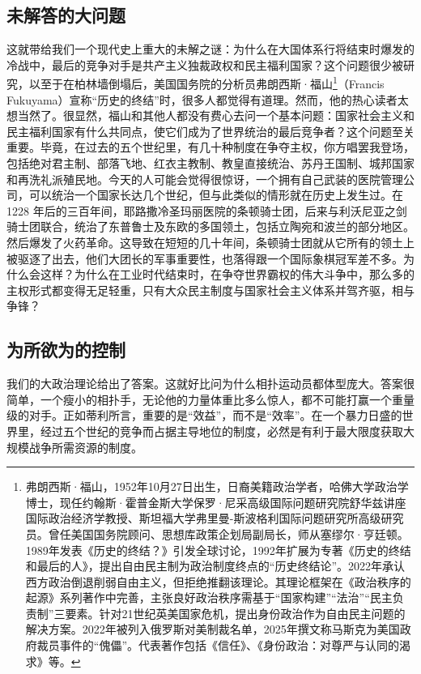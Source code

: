 \subsection{未解答的大问题}
这就带给我们一个现代史上重大的未解之谜：为什么在大国体系行将结束时爆发的冷战中，最后的竞争对手是共产主义独裁政权和民主福利国家？这个问题很少被研究，以至于在柏林墙倒塌后，美国国务院的分析员弗朗西斯·福山\footnote{弗朗西斯·福山，1952年10月27日出生，日裔美籍政治学者，哈佛大学政治学博士，现任约翰斯·霍普金斯大学保罗·尼采高级国际问题研究院舒华兹讲座国际政治经济学教授、斯坦福大学弗里曼-斯波格利国际问题研究所高级研究员。曾任美国国务院顾问、思想库政策企划局副局长，师从塞缪尔·亨廷顿。1989年发表《历史的终结？》引发全球讨论，1992年扩展为专著《历史的终结和最后的人》，提出自由民主制为政治制度终点的“历史终结论”。2022年承认西方政治倒退削弱自由主义，但拒绝推翻该理论。其理论框架在《政治秩序的起源》系列著作中完善，主张良好政治秩序需基于“国家构建”“法治”“民主负责制”三要素。针对21世纪英美国家危机，提出身份政治作为自由民主问题的解决方案。2022年被列入俄罗斯对美制裁名单，2025年撰文称马斯克为美国政府裁员事件的“傀儡”。代表著作包括《信任》、《身份政治：对尊严与认同的渴求》等。}（Francis Fukuyama）宣称“历史的终结”时，很多人都觉得有道理。然而，他的热心读者太想当然了。很显然，福山和其他人都没有费心去问一个基本问题：国家社会主义和民主福利国家有什么共同点，使它们成为了世界统治的最后竞争者？这个问题至关重要。毕竟，在过去的五个世纪里，有几十种制度在争夺主权，你方唱罢我登场，包括绝对君主制、部落飞地、红衣主教制、教皇直接统治、苏丹王国制、城邦国家和再洗礼派殖民地。今天的人可能会觉得很惊讶，一个拥有自己武装的医院管理公司，可以统治一个国家长达几个世纪，但与此类似的情形就在历史上发生过。在 1228 年后的三百年间，耶路撒冷圣玛丽医院的条顿骑士团，后来与利沃尼亚之剑骑士团联合，统治了东普鲁士及东欧的多国领土，包括立陶宛和波兰的部分地区。然后爆发了火药革命。这导致在短短的几十年间，条顿骑士团就从它所有的领土上被驱逐了出去，他们大团长的军事重要性，也落得跟一个国际象棋冠军差不多。为什么会这样？为什么在工业时代结束时，在争夺世界霸权的伟大斗争中，那么多的主权形式都变得无足轻重，只有大众民主制度与国家社会主义体系并驾齐驱，相与争锋？

\subsection{为所欲为的控制}
我们的大政治理论给出了答案。这就好比问为什么相扑运动员都体型庞大。答案很简单，一个瘦小的相扑手，无论他的力量体重比多么惊人，都不可能打赢一个重量级的对手。正如蒂利所言，重要的是“效益”，而不是“效率”。在一个暴力日盛的世界里，经过五个世纪的竞争而占据主导地位的制度，必然是有利于最大限度获取大规模战争所需资源的制度。

